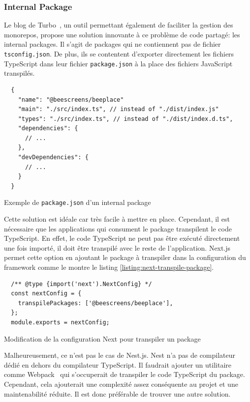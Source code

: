 \subsubsection{Internal Package}

Le blog de Turbo~\cite{you-might-not-need-typescript-project-references}, un outil permettant également de faciliter la gestion des monorepos, propose une solution innovante à ce problème de code partagé: les internal packages. Il s'agit de packages qui ne contiennent pas de fichier \texttt{tsconfig.json}. De plus, ils se contentent d'exporter directement les fichiers TypeScript dans leur fichier \texttt{package.json} à la place des fichiers JavaScript transpilés.

\begin{listing}[H]
  \begin{verbatim}
  {
    "name": "@beescreens/beeplace"
    "main": "./src/index.ts", // instead of "./dist/index.js"
    "types": "./src/index.ts", // instead of "./dist/index.d.ts",
    "dependencies": {
      // ...
    },
    "devDependencies": {
      // ...
    }
  }
\end{verbatim}
  \caption{Exemple de \texttt{package.json} d'un internal package}
  \label{listing:internal-package-json}
\end{listing}

Cette solution est idéale car très facile à mettre en place. Cependant, il est nécessaire que les applications qui consument le package transpilent le code TypeScript. En effet, le code TypeScript ne peut pas être exécuté directement une fois importé, il doit être transpilé avec le reste de l'application. Next.js permet cette option en ajoutant le package à transpiler dans la configuration du framework comme le montre le listing \ref{listing:next-transpile-package}.

\begin{listing}[H]
  \begin{verbatim}
  /** @type {import('next').NextConfig} */
  const nextConfig = {
    transpilePackages: ['@beescreens/beeplace'],
  };
  module.exports = nextConfig;
\end{verbatim}
  \caption{Modification de la configuration Next pour transpiler un package}
  \label{listing:next-transpile-package}
\end{listing}

Malheureusement, ce n'est pas le cas de Nest.js. Nest n'a pas de compilateur dédié en dehors du compilateur TypeScript. Il faudrait ajouter un utilitaire comme Webpack~\cite{webpack} qui s'occuperait de transpiler le code TypeScript du package. Cependant, cela ajouterait une complexité assez conséquente au projet et une maintenabilité réduite. Il est donc préférable de trouver une autre solution.

